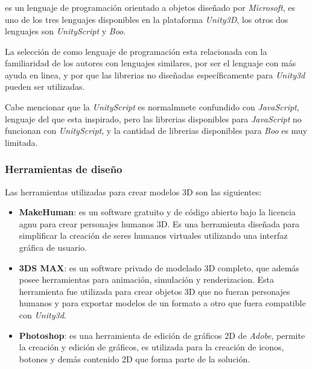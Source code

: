 \subsubsection{\cs}

\cs es un lenguaje de programación orientado a objetos diseñado por
\textit{Microsoft}, es uno de los tres lenguajes disponibles en la plataforma
\textit{Unity3D}, los otros dos lenguajes son \textit{UnityScript} y
\textit{Boo}\cite{unity:script}.

La selección de \cs como lenguaje de programación esta relacionada con la
familiaridad de los autores con lenguajes similares, por ser el lenguaje con más
ayuda en linea, y por que las librerias no diseñadas específicamente para
\textit{Unity3d} pueden ser utilizadas.

Cabe mencionar que la \textit{UnityScript} es normalmnete confundido con
\textit{JavaScript}, lenguaje del que esta inspirado, pero las librerias
disponibles para \textit{JavaScript} no funcionan con \textit{UnityScript}, y la
cantidad de librerias disponibles para \textit{Boo} es muy limitada.

\subsubsection{Herramientas de diseño}

Las herramientas utilizadas para crear modelos 3D son las siguientes:

\begin{itemize}
\item \textbf{MakeHuman}: es un software gratuito y de código abierto bajo la
    licencia \Gls{agnu} para crear personajes humanos 3D. Es una herramienta
    diseñada para simplificar la creación de seres humanos virtuales utilizando
    una interfaz gráfica de usuario\cite{makehuman}. 
\item \textbf{3DS MAX}: es un software privado de modelado 3D completo, que
    además posee herramientas para animación, simulación y renderizacion. Esta
    herramienta fue utilizada para crear objetos 3D que no fueran personajes
    humanos y para exportar modelos de un formato a otro que fuera compatible
    con \textit{Unity3d}\cite{3dsmax}.
\item \textbf{Photoshop}: es una herramienta de edición de gráficos 2D de
    \textit{Adobe}, permite la creación y edición de gráficos, es utilizada para
    la creación de iconos, botones y demás contenido 2D que forma parte de la
    solución.
\end{itemize}

